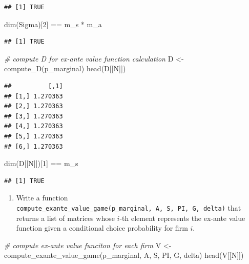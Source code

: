 \documentclass[
]{book}
\newenvironment{Shaded}{\begin{snugshade}}{\end{snugshade}}
\newcommand{\CommentTok}[1]{\textcolor[rgb]{0.56,0.35,0.01}{\textit{#1}}}
\newcommand{\DecValTok}[1]{\textcolor[rgb]{0.00,0.00,0.81}{#1}}
\newcommand{\FunctionTok}[1]{\textcolor[rgb]{0.00,0.00,0.00}{#1}}
\newcommand{\NormalTok}[1]{#1}
\newcommand{\OtherTok}[1]{\textcolor[rgb]{0.56,0.35,0.01}{#1}}
\newcommand{\SpecialCharTok}[1]{\textcolor[rgb]{0.00,0.00,0.00}{#1}}
\providecommand{\tightlist}{%
  \setlength{\itemsep}{0pt}\setlength{\parskip}{0pt}}
\begin{document}
\begin{verbatim}
## [1] TRUE
\end{verbatim}

\begin{Shaded}
\begin{Highlighting}[]
\FunctionTok{dim}\NormalTok{(Sigma)[}\DecValTok{2}\NormalTok{] }\SpecialCharTok{==}\NormalTok{ m\_s }\SpecialCharTok{*}\NormalTok{ m\_a}
\end{Highlighting}
\end{Shaded}

\begin{verbatim}
## [1] TRUE
\end{verbatim}

\begin{Shaded}
\begin{Highlighting}[]
\CommentTok{\# compute D for ex{-}ante value function calculation}
\NormalTok{D }\OtherTok{\textless{}{-}} \FunctionTok{compute\_D}\NormalTok{(p\_marginal)}
\FunctionTok{head}\NormalTok{(D[[N]])}
\end{Highlighting}
\end{Shaded}

\begin{verbatim}
##          [,1]
## [1,] 1.270363
## [2,] 1.270363
## [3,] 1.270363
## [4,] 1.270363
## [5,] 1.270363
## [6,] 1.270363
\end{verbatim}

\begin{Shaded}
\begin{Highlighting}[]
\FunctionTok{dim}\NormalTok{(D[[N]])[}\DecValTok{1}\NormalTok{] }\SpecialCharTok{==}\NormalTok{ m\_s}
\end{Highlighting}
\end{Shaded}

\begin{verbatim}
## [1] TRUE
\end{verbatim}

\begin{enumerate}
\def\labelenumi{\arabic{enumi}.}
\setcounter{enumi}{6}
\tightlist
\item
  Write a function \texttt{compute\_exante\_value\_game(p\_marginal,\ A,\ S,\ PI,\ G,\ delta)} that returns a list of matrices whose \(i\)-th element represents the ex-ante value function given a conditional choice probability for firm \(i\).
\end{enumerate}

\begin{Shaded}
\begin{Highlighting}[]
\CommentTok{\# compute ex{-}ante value funciton for each firm}
\NormalTok{V }\OtherTok{\textless{}{-}} \FunctionTok{compute\_exante\_value\_game}\NormalTok{(p\_marginal, A, S, PI, G, delta)}
\FunctionTok{head}\NormalTok{(V[[N]])}
\end{Highlighting}
\end{Shaded}
\end{document}
